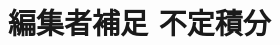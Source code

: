 \documentclass[dvipdfmx,a4j,10pt]{jsarticle}
\theoremstyle{mystyle1}
\newtheorem{thm}[dfn]{定理}
\newtheorem{prop}[dfn]{命題}
\theoremstyle{mystyle2}
\newtheorem{note}{注意}
\begin{document}
\begin{comment}
\begin{framed}
\begin{prop}\label{prop13.2}
十分大きな$n$に対して$a_n\neq0$かつ$\displaystyle\lim_{n\to\infty}\left|\frac{a_{n+1}}{a_n}\right|$が存在するならば，$\displaystyle R=\lim_{n\to\infty}\left|\frac{a_n}{a_{n+1}}\right|$
\end{prop}
\end{framed}

\noindent
{\bf 命題\ref{prop13.2}の証明}\ 定理\ref{thm4.5}を$\{a_n x^n\}$に適用すればよい。

\begin{note}
$\displaystyle\sum_{n=0}^\infty\left(\sum_{m=0}^\infty a_{(n,m)} \right)\neq \sum_{m=0}^\infty\left(\sum_{n=0}^\infty a_{(n,m)}\right)$，$\displaystyle\frac{d}{dx}\left(\sum_{n=0}^\infty a_n x^n\right)\neq \sum_{n=0}^\infty \frac{d}{dx}(a_n)x^n$
\end{note}

\begin{framed}
\begin{thm}\label{thm13.3}
$\displaystyle\sum a_n x^n$の収束半径を$R$とし，$|x|<R$で$\displaystyle f(x):=\sum a_n x^n$とすると，$f$は$|x|<R$で無限回微分可能で$n!a_n:=b_n$とおくと$\displaystyle f^{(m)}(x)=\sum_{n=0}^\infty \frac{b_{n+m}}{n!}x^n$
\end{thm}
\end{framed}

\noindent
{\bf 定理\ref{thm13.3}の証明}\\ $\displaystyle \sum_{n=1}^\infty (n+1)a_{n+1}x^n$の収束判定も$R$になることを示せば，定理\ref{thm12.5}より$\displaystyle f'(x)= \sum_{n=1}^\infty (n+1)a_{n+1}x^n $が成立する。（これを$n$について帰納的に繰り返す）
\[
\varlimsup_{n\to\infty}(n+1)^{\frac{1}{n}}|a_{n+1}|^{\frac{1}{n}}=\varlimsup_{n\to\infty}|a_n|^{\frac{1}{n}}=\frac{1}{R}
\]
より成立。

\end{comment}

\newpage


\section{編集者補足 不定積分}
\end{document}
